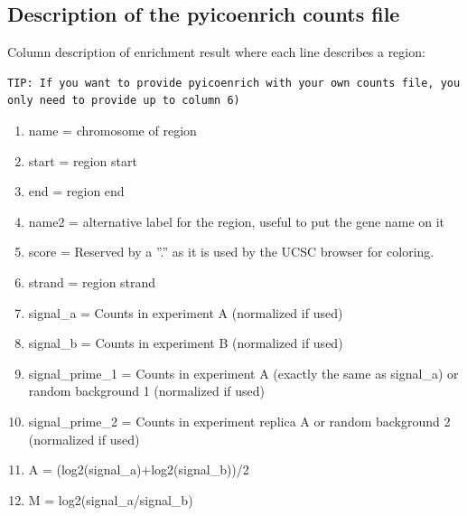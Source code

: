 \documentclass[letterpaper,10pt,english]{sphinxmanual}
\begin{document}
\subsection{Description of the pyicoenrich counts file}
\label{pyicoenrich:description-of-the-pyicoenrich-counts-file}
Column description of enrichment result where each line describes a region:

\begin{Verbatim}[commandchars=\\\{\}]
TIP: If you want to provide pyicoenrich with your own counts file, you only need to provide up to column 6)
\end{Verbatim}
\begin{enumerate}
\item {} 
name                    =  chromosome of region

\item {} 
start                   =  region start

\item {} 
end                     =  region end

\item {} 
name2                   =  alternative label for the region, useful to put the gene name on it

\item {} 
score                   =  Reserved by a ''.'' as it is used by the UCSC browser for coloring.

\item {} 
strand                  =  region strand

\item {} 
signal\_a                =  Counts in experiment A (normalized if used)

\item {} 
signal\_b                =  Counts in experiment B (normalized if used)

\item {} 
signal\_prime\_1          =  Counts in experiment A (exactly the same as signal\_a) or random background 1 (normalized if used)

\item {} 
signal\_prime\_2         =  Counts in experiment replica A or random background 2 (normalized if used)

\item {} 
A                      =  (log2(signal\_a)+log2(signal\_b))/2

\item {} 
M                      =  log2(signal\_a/signal\_b)


\end{enumerate}
\end{document}
